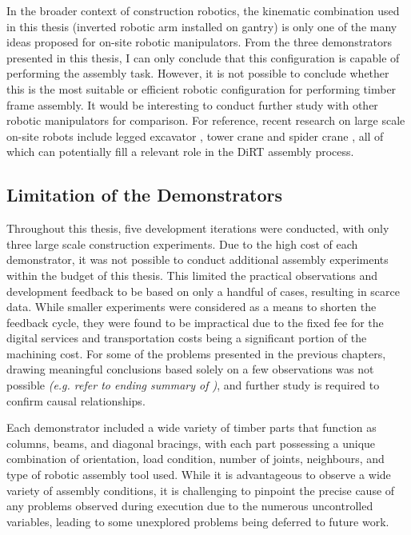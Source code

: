 In the broader context of construction robotics, the kinematic combination used in this thesis (inverted robotic arm installed on gantry) is only one of the many ideas proposed for on-site robotic manipulators. From the three demonstrators presented in this thesis, I can only conclude that this configuration is capable of performing the assembly task. However, it is not possible to conclude whether this is the most suitable or efficient robotic configuration for performing timber frame assembly. It would be interesting to conduct further study with other robotic manipulators for comparison. For reference, recent research on large scale on-site robots include legged excavator \parencite{wermelingerGraspingObjectReorientation2021}, tower crane \parencite{instituteforsystemdynamicsuniversityofstuttgartResearchProjectCyberphysical2023} and spider crane \parencite{integrativecomputationaldesignandconstructionforarchitectureuniversityofstuttgartResearchProject162023}, all of which can potentially fill a relevant role in the DiRT assembly process.

\subsection{Limitation of the Demonstrators}
\label{subsection:limitation-of-the-demonstrators}

Throughout this thesis, five development iterations were conducted, with only three large scale construction experiments. Due to the high cost of each demonstrator, it was not possible to conduct additional assembly experiments within the budget of this thesis. This limited the practical observations and development feedback to be based on only a handful of cases, resulting in scarce data. While smaller experiments were considered as a means to shorten the feedback cycle, they were found to be impractical due to the fixed fee for the digital services and transportation costs being a significant portion of the machining cost. For some of the problems presented in the previous chapters, drawing meaningful conclusions based solely on a few observations was not possible \textit{(e.g. refer to ending summary of )}, and further study is required to confirm causal relationships. 

Each demonstrator included a wide variety of timber parts that function as columns, beams, and diagonal bracings, with each part possessing a unique combination of orientation, load condition, number of joints, neighbours, and type of robotic assembly tool used. While it is advantageous to observe a wide variety of assembly conditions, it is challenging to pinpoint the precise cause of any problems observed during execution due to the numerous uncontrolled variables, leading to some unexplored problems being deferred to future work.

